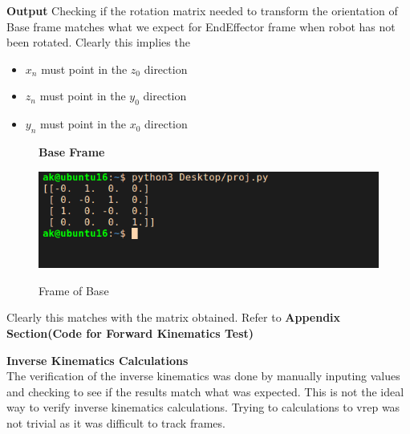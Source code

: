 \documentclass[12pt]{article}
\begin{document}
\textbf{Output}
Checking if the rotation matrix needed to transform the orientation of Base frame matches what we expect for EndEffector frame when robot 
has not been rotated.
Clearly this implies the
\begin{itemize}
  \item $x_n$ must point in the $z_0$ direction
  \item $z_n$ must point in the $y_0$ direction
  \item $y_n$ must point in the $x_0$ direction

\end{itemize}
\begin{figure}[H]
    \centering
    \textbf{Base Frame}\par\medskip
    \includegraphics[scale = 0.8]{fkin.png}\\[0.0 cm]	%
    \caption{Frame of Base}
\end{figure}
Clearly this matches with the matrix obtained. Refer to \textbf{Appendix Section(Code for Forward Kinematics Test)}

\textbf{Inverse Kinematics Calculations} \\
 The verification of the inverse kinematics was done by manually inputing values and checking to see if the results 
match what was expected. This is not the ideal way to verify inverse kinematics calculations. Trying to calculations to vrep
was not trivial as it was difficult to track frames.

\newpage
\end{document}
